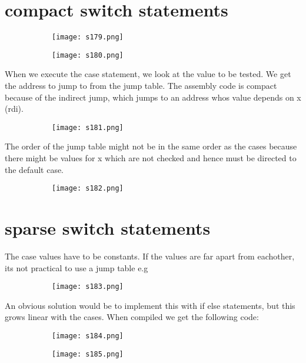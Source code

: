 \documentclass[8pt]{extreport}
\begin{document}
\section{compact switch statements}
\begin{figure}[H]
\centering
\begin{subfigure}[b]{0.4\linewidth}
\texttt{[image: s179.png]}
\end{subfigure}
\begin{subfigure}[b]{0.4\linewidth}
\texttt{[image: s180.png]}
\end{subfigure}
\end{figure}
When we execute the case statement, we look at the value to be tested. We get the address to jump to from the jump table. The assembly code is compact because of the indirect jump, which jumps to an address whos value depends on x (rdi).
\begin{figure}[H]
\centering
\begin{subfigure}[b]{0.4\linewidth}
\texttt{[image: s181.png]}
\end{subfigure}
\end{figure}
The order of the jump table might not be in the same order as the cases because there might be values for x which are not checked and hence must be directed to the default case.
\begin{figure}[H]
\centering
\begin{subfigure}[b]{0.4\linewidth}
\texttt{[image: s182.png]}
\end{subfigure}
\end{figure}

\section{sparse switch statements}
The case values have to be constants. If the values are far apart from eachother, its not practical to use a jump table e.g
\begin{figure}[H]
\centering
\begin{subfigure}[b]{0.4\linewidth}
\texttt{[image: s183.png]}
\end{subfigure}
\end{figure}
An obvious solution would be to implement this with if else statements, but this grows linear with the cases. When compiled we get the following code:
\begin{figure}[H]
\centering
\begin{subfigure}[b]{0.4\linewidth}
\texttt{[image: s184.png]}
\end{subfigure}
\begin{subfigure}[b]{0.4\linewidth}
\texttt{[image: s185.png]}
\end{subfigure}
\end{figure}
\end{document}
